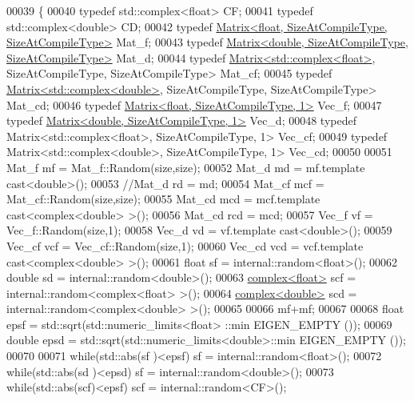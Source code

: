\begin{DoxyCode}
00039 \{
00040   \textcolor{keyword}{typedef} std::complex<float>   CF;
00041   \textcolor{keyword}{typedef} std::complex<double>  CD;
00042   \textcolor{keyword}{typedef} \hyperlink{group___core___module_class_eigen_1_1_matrix}{Matrix<float, SizeAtCompileType, SizeAtCompileType>}
       Mat\_f;
00043   \textcolor{keyword}{typedef} \hyperlink{group___core___module_class_eigen_1_1_matrix}{Matrix<double, SizeAtCompileType, SizeAtCompileType>}
       Mat\_d;
00044   \textcolor{keyword}{typedef} \hyperlink{group___core___module_class_eigen_1_1_matrix}{Matrix<std::complex<float>}, SizeAtCompileType, SizeAtCompileType> 
      Mat\_cf;
00045   \textcolor{keyword}{typedef} \hyperlink{group___core___module_class_eigen_1_1_matrix}{Matrix<std::complex<double>}, SizeAtCompileType, SizeAtCompileType> 
      Mat\_cd;
00046   \textcolor{keyword}{typedef} \hyperlink{group___core___module_class_eigen_1_1_matrix}{Matrix<float, SizeAtCompileType, 1>} Vec\_f;
00047   \textcolor{keyword}{typedef} \hyperlink{group___core___module_class_eigen_1_1_matrix}{Matrix<double, SizeAtCompileType, 1>} Vec\_d;
00048   \textcolor{keyword}{typedef} Matrix<std::complex<float>, SizeAtCompileType, 1> Vec\_cf;
00049   \textcolor{keyword}{typedef} Matrix<std::complex<double>, SizeAtCompileType, 1> Vec\_cd;
00050 
00051   Mat\_f mf    = Mat\_f::Random(size,size);
00052   Mat\_d md    = mf.template cast<double>();
00053   \textcolor{comment}{//Mat\_d rd    = md;}
00054   Mat\_cf mcf  = Mat\_cf::Random(size,size);
00055   Mat\_cd mcd  = mcf.template cast<complex<double> >();
00056   Mat\_cd rcd = mcd;
00057   Vec\_f vf    = Vec\_f::Random(size,1);
00058   Vec\_d vd    = vf.template cast<double>();
00059   Vec\_cf vcf  = Vec\_cf::Random(size,1);
00060   Vec\_cd vcd  = vcf.template cast<complex<double> >();
00061   \textcolor{keywordtype}{float}           sf  = internal::random<float>();
00062   \textcolor{keywordtype}{double}          sd  = internal::random<double>();
00063   \hyperlink{structcomplex}{complex<float>}  scf = internal::random<complex<float> >();
00064   \hyperlink{structcomplex}{complex<double>} scd = internal::random<complex<double> >();
00065 
00066   mf+mf;
00067 
00068   \textcolor{keywordtype}{float}  epsf = std::sqrt(std::numeric\_limits<float> ::min EIGEN\_EMPTY ());
00069   \textcolor{keywordtype}{double} epsd = std::sqrt(std::numeric\_limits<double>::min EIGEN\_EMPTY ());
00070 
00071   \textcolor{keywordflow}{while}(std::abs(sf )<epsf) sf  = internal::random<float>();
00072   \textcolor{keywordflow}{while}(std::abs(sd )<epsd) sf  = internal::random<double>();
00073   \textcolor{keywordflow}{while}(std::abs(scf)<epsf) scf = internal::random<CF>();

\end{DoxyCode}
